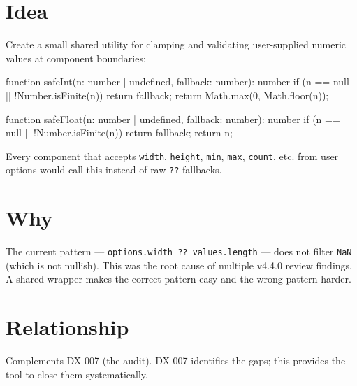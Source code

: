 \section{Idea}\label{record-313-idea}

Create a small shared utility for clamping and validating user-supplied numeric values at component boundaries:

\begin{CodeBlock}
function safeInt(n: number | undefined, fallback: number): number {
  if (n == null || !Number.isFinite(n)) return fallback;
  return Math.max(0, Math.floor(n));
}

function safeFloat(n: number | undefined, fallback: number): number {
  if (n == null || !Number.isFinite(n)) return fallback;
  return n;
}
\end{CodeBlock}

Every component that accepts \texttt{w\allowbreak{}i\allowbreak{}d\allowbreak{}t\allowbreak{}h}, \texttt{h\allowbreak{}e\allowbreak{}i\allowbreak{}g\allowbreak{}h\allowbreak{}t}, \texttt{m\allowbreak{}i\allowbreak{}n}, \texttt{m\allowbreak{}a\allowbreak{}x}, \texttt{c\allowbreak{}o\allowbreak{}u\allowbreak{}n\allowbreak{}t}, etc. from user options would call this instead of raw \texttt{?\allowbreak{}?} fallbacks.

\section{Why}\label{record-313-why}

The current pattern --- \texttt{o\allowbreak{}p\allowbreak{}t\allowbreak{}i\allowbreak{}o\allowbreak{}n\allowbreak{}s\allowbreak{}.\allowbreak{}w\allowbreak{}i\allowbreak{}d\allowbreak{}t\allowbreak{}h\allowbreak{} \allowbreak{}?\allowbreak{}?\allowbreak{} \allowbreak{}v\allowbreak{}a\allowbreak{}l\allowbreak{}u\allowbreak{}e\allowbreak{}s\allowbreak{}.\allowbreak{}l\allowbreak{}e\allowbreak{}n\allowbreak{}g\allowbreak{}t\allowbreak{}h} --- does not filter \texttt{N\allowbreak{}a\allowbreak{}N} (which is not nullish). This was the root cause of multiple v4.4.0 review findings. A shared wrapper makes the correct pattern easy and the wrong pattern harder.

\section{Relationship}\label{record-313-relationship}

Complements DX-007 (the audit). DX-007 identifies the gaps; this provides the tool to close them systematically.

